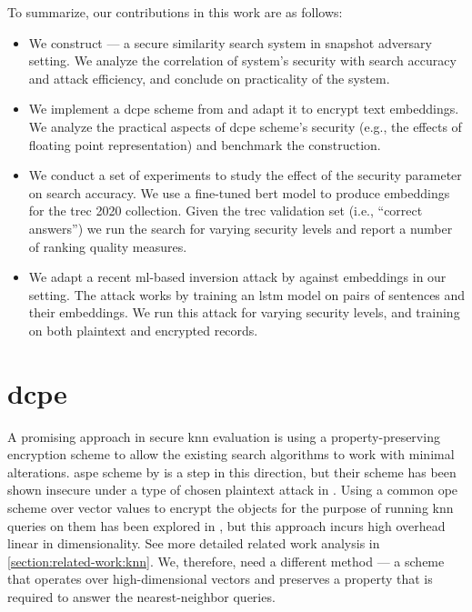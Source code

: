 		To summarize, our contributions in this work are as follows:
		\begin{itemize}
			\item
				We construct \kanon{} --- a secure similarity search system in snapshot adversary setting.
				We analyze the correlation of system's security with search accuracy and attack efficiency, and conclude on practicality of the \kanon{} system.

			\item
				We implement a \acrfull{dcpe} scheme from \cite{dcpe} and adapt it to encrypt text embeddings.
				We analyze the practical aspects of \acrshort{dcpe} scheme's security (e.g., the effects of floating point representation) and benchmark the construction.

			\item
				We conduct a set of experiments to study the effect of the security parameter on search accuracy.
				We use a fine-tuned \acrshort{bert} model to produce embeddings for the \acrshort{trec} 2020 collection.
				Given the \acrshort{trec} validation set (i.e., ``correct answers'') we run the search for varying security levels and report a number of ranking quality measures.

			\item
				We adapt a recent \acrshort{ml}-based inversion attack by \textcite{embedding-attacks} against embeddings in our setting.
				The attack works by training an \acrshort{lstm} model on pairs of sentences and their embeddings.
				We run this attack for varying security levels, and training on both plaintext and encrypted records.

		\end{itemize}

	\section{\texorpdfstring{\acrlong{dcpe}}{Distance Comparison Preserving Encryption}}

		A promising approach in secure \acrshort{knn} evaluation is using a property-preserving encryption scheme to allow the existing search algorithms to work with minimal alterations.
		\acrshort{aspe} scheme by \textcite{knn-aspe} is a step in this direction, but their scheme has been shown insecure under a type of chosen plaintext attack in \cite{secure-nn-revisited-break-aspe}.
		Using a common \acrshort{ope} scheme over vector values to encrypt the objects for the purpose of running \acrshort{knn} queries on them has been explored in \cite{quick-n}, but this approach incurs high overhead linear in dimensionality.
		See more detailed related work analysis in \cref{section:related-work:knn}.
		We, therefore, need a different method --- a scheme that operates over high-dimensional vectors and preserves a property that is required to answer the nearest-neighbor queries.

